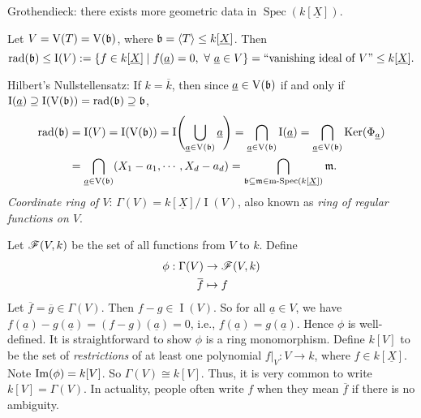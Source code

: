 \begin{construction*}
    Grothendieck: there exists more geometric data in $\operatorname{Spec}(k[\underline X])$. \par 
    Let $V = \operatorname{V}(T) = \operatorname{V}(\mathfrak{b})$, where $\mathfrak{b} = \langle T \rangle \leq k[\underline X]$. Then
    \[\operatorname{rad}(\mathfrak{b}) \leq \operatorname{I}(V) := \{f \in k[\underline X] \mid f(\underline a) = 0,\ \forall \  \underline a \in V\} = \text{``vanishing ideal of $V$''} \leq k[\underline X].\]
    \par Hilbert's Nullstellensatz: If $k = \overline k$, then since $\underline a \in \operatorname{V}(\mathfrak{b})$ if and only if $\operatorname{I}(\underline a) \supseteq \operatorname{I}(\operatorname{V}(\mathfrak{b})) = \operatorname{rad}(\mathfrak{b}) \supseteq \mathfrak{b}$,
    \begin{align*}
        \operatorname{rad}(\mathfrak{b}) &= \operatorname{I}(V) = \operatorname{I}(\operatorname{V}(\mathfrak{b})) = \operatorname{I}\Biggl(\bigcup_{\underline a \in \operatorname{V}(\mathfrak{b})} \underline a \Biggr) = \bigcap_{\underline a \in \operatorname{V}(\mathfrak{b})} \operatorname{I}(\underline a) = \bigcap_{\underline a \in \operatorname{V}(\mathfrak{b})} \operatorname{Ker}(\Phi_{\underline a}) \\
        &= \bigcap_{\underline a \in \operatorname{V}(\mathfrak{b})} (X_1-a_1,\cdots,X_d-a_d) = \bigcap_{\mathfrak{b} \subseteq \mathfrak{m} \in \operatorname{m-Spec}(k[\underline X])} \mathfrak{m}.
    \end{align*}
    \emph{Coordinate ring of $V$}: $\Gamma(V) = k[\underline X]/\operatorname{I}(V)$, also known as \emph{ring of regular functions on $V$}. \par 
    Let $\mathscr{F}(V,k)$ be the set of all functions from $V$ to $k$. Define
    \begin{align*}
        \phi: \Gamma(V) & \to \ssF(V,k) \\
        \overbar f &\mapsto f
    \end{align*}
    Let $\overbar f = \overbar g \in \Gamma(V)$. Then $f-g \in \operatorname{I}(V)$. So for all $\underline a \in V$, we have $f(\underline a)-g(\underline a) = (f-g)(\underline a) = 0$, i.e., $f(\underline a) = g(\underline a)$. Hence $\phi$ is well-defined. It is straightforward to show $\phi$ is a ring monomorphism. Define $k[V]$ to be the set of \emph{restrictions} of at least one polynomial $f|_V: V \to k$, where $f \in k[\underline X]$. Note $\operatorname{Im}(\phi) = k[V]$. So $\Gamma(V) \cong k[V]$. Thus, it is very common to write $k[V] = \Gamma(V)$. In actuality, people often write $f$ when they mean $\overbar f$ if there is no ambiguity. \par 

\end{construction*}
